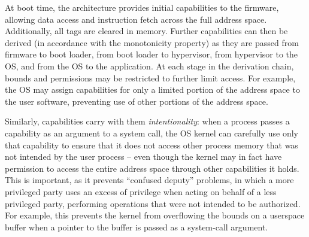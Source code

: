 \documentclass[12pt,twoside,openright,usletter]{article}
\newcommand{\note}[2]{{\color{blue}[ Note: #1 - #2]}}
\renewcommand{\note}[2]{\relax\ifhmode\unskip\fi}
\newcommand{\rwnote}[1]{\note{#1}{Robert W.}}
\newcommand{\psnote}[1]{\note{#1}{Peter S.}}
\newcommand{\pgnnote}[1]{\note{#1}{Peter N.}}
\begin{document}
\begin{description}

\end{description}

At boot time, the architecture provides initial capabilities to the firmware,
allowing data access and instruction fetch across the full address space.
Additionally, all tags are cleared in memory.
Further capabilities can then be derived (in accordance with the monotonicity
property) as they are passed from firmware to boot loader, from boot loader to
hypervisor, from hypervisor to the OS, and from the OS to the application.
At each stage in the derivation chain, bounds and permissions may be
restricted to further limit access.
For example, the OS may assign capabilities for only a limited portion of the
address space to the user software, preventing use of other portions of the
address space.



Similarly, capabilities carry with them \textit{intentionality}: when a
process passes a capability as an argument to a system call, the OS kernel can
carefully use only that capability to ensure that it does not access other
process memory that was not intended by the user process -- even though the
kernel may in fact have permission to access the entire address space through
other capabilities it holds.
This is important, as it prevents ``confused deputy'' problems, in which a more
privileged party uses an excess of privilege when acting on behalf of a less
privileged party, performing operations that were not intended to be
authorized.
For example, this prevents the kernel from overflowing the bounds on a
userspace buffer when a pointer to the buffer is passed as a
system-call argument.
\end{document}
